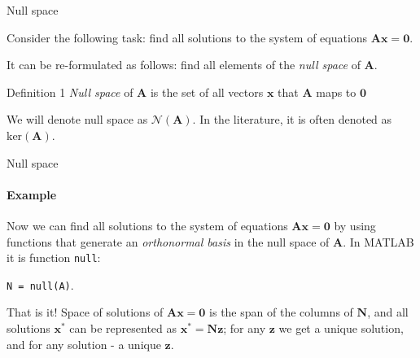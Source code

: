 \documentclass{beamer}
\begin{document}
\begin{frame}{Null space}
\begin{flushleft}

Consider the following task: find all solutions to the system of equations $\mathbf{A} \mathbf{x} = \mathbf{0}$.

\bigskip

It can be re-formulated as follows: find all elements of the \emph{null space} of $\mathbf{A}$.

\begin{block}{Definition 1}
  \emph{Null space} of $\mathbf{A}$ is the set of all vectors $\mathbf{x}$ that $\mathbf{A}$ maps to $\mathbf{0}$
\end{block}

\bigskip

We will denote null space as $\mathcal{N}(\mathbf{A})$. In the literature, it is often denoted as $\text{ker}(\mathbf{A})$.

\end{flushleft}
\end{frame}


\begin{frame}{Null space}
\framesubtitle{Example}
\begin{flushleft}

Now we can find all solutions to the system of equations $\mathbf{A} \mathbf{x} = \mathbf{0}$ by using functions that generate an \emph{orthonormal basis} in the null space of $\mathbf{A}$. In MATLAB it is function \texttt{null}:

\bigskip

\texttt{N = null(A)}.

\bigskip

That is it! Space of solutions of $\mathbf{A} \mathbf{x} = \mathbf{0}$ is the span of the columns of $\mathbf{N}$, and all solutions $\mathbf{x}^*$ can be represented as $\mathbf{x}^* = \mathbf{N}\mathbf{z}$; for any $\mathbf{z}$ we get a unique solution, and for any solution - a unique $\mathbf{z}$.

\end{flushleft}
\end{frame}
\end{document}
